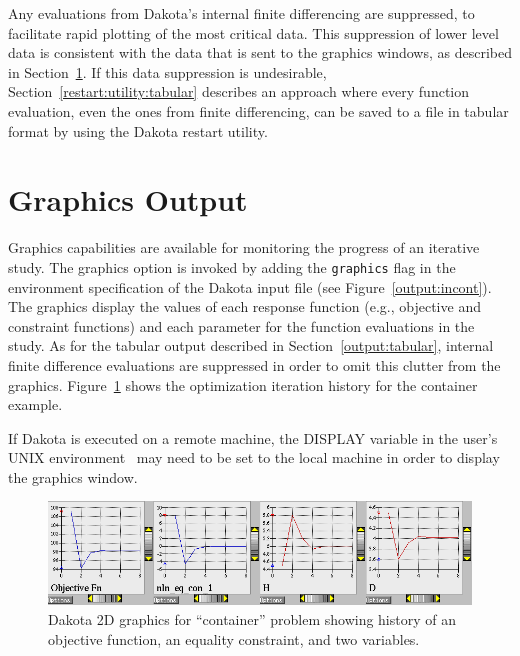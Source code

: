Any evaluations from Dakota's internal finite differencing are
suppressed, to facilitate rapid plotting of the most critical data.
This suppression of lower level data is consistent with the data that
is sent to the graphics windows, as described in
Section~\ref{output:graphics}. If this data suppression is
undesirable, Section~\ref{restart:utility:tabular} describes an
approach where every function evaluation, even the ones from finite
differencing, can be saved to a file in tabular format by using the
Dakota restart utility.


\section{Graphics Output}\label{output:graphics}

Graphics capabilities are available for monitoring the progress of an
iterative study. The graphics option is invoked by adding the
\texttt{graphics} flag in the environment specification of the Dakota
input file (see Figure~\ref{output:incont}). The graphics display
the values of each response function (e.g., objective and constraint
functions) and each parameter for the function evaluations in the
study. As for the tabular output described in
Section~\ref{output:tabular}, internal finite difference evaluations
are suppressed in order to omit this clutter from the graphics.
Figure~\ref{output:2dcont} shows the optimization iteration history
for the container example.

If Dakota is executed on a remote machine, the DISPLAY variable in the
user's UNIX environment~\cite{Gil92} may need to be set to the local
machine in order to display the graphics window. 

\begin{figure}
\centering
\includegraphics[width=\textwidth]{images/container_graphic}
\caption{Dakota 2D graphics for ``container'' problem showing history of
an objective function, an equality constraint, and two variables.}
\label{output:2dcont}
\end{figure}

